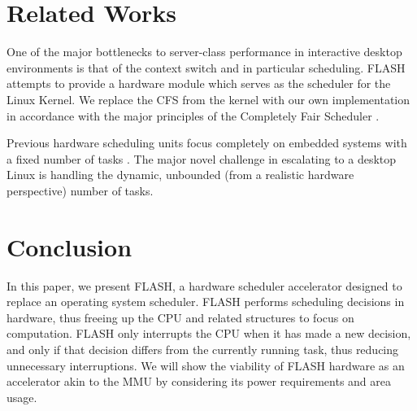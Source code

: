 \documentclass{sig-alternate-10pt}
\begin{document}
\section{Related Works}
One of the major bottlenecks to server-class performance in interactive
desktop environments is that of the context switch and in particular
scheduling.  FLASH attempts to provide a hardware module which serves as the
scheduler for the Linux Kernel.  We replace the CFS from the kernel with our
own implementation in accordance with the major principles of the Completely
Fair Scheduler \cite{wong2008cfs}.

Previous hardware scheduling units focus completely on embedded systems with
a fixed number of tasks \cite{nakano1995hardware, morton2004hardware,
nacul2007hardware, kuacharoen2003configurable, park2008hardware}.  The major
novel challenge in escalating to a desktop Linux is handling the dynamic,
unbounded (from a realistic hardware perspective) number of tasks.


\section{Conclusion}
In this paper, we present FLASH, a hardware scheduler accelerator designed to replace an operating system scheduler. FLASH performs scheduling decisions in hardware, thus freeing up the CPU and related structures to focus on computation. FLASH only interrupts the CPU when it has made a new decision, and only if that decision differs from the currently running task, thus reducing unnecessary interruptions. We will show the viability of FLASH hardware as an accelerator akin to the MMU by considering its power requirements and area usage.

\nocite{*}
{
	
	
}
\end{document}
